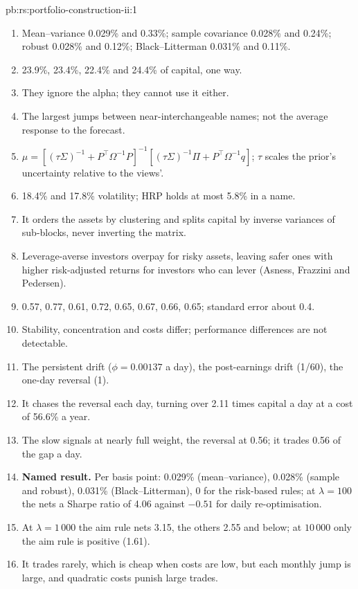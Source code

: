 \begin{solution}{pb:rs:portfolio-construction-ii:1}
\begin{enumerate}
\item Mean--variance 0.029\% and 0.33\%; sample covariance 0.028\% and 0.24\%; robust 0.028\% and 0.12\%; Black--Litterman 0.031\% and 0.11\%.
\item 23.9\%, 23.4\%, 22.4\% and 24.4\% of capital, one way.
\item They ignore the alpha; they cannot use it either.
\item The largest jumps between near-interchangeable names; not the average response to the forecast.
\item $\mu = [(\tau\Sigma)^{-1} + P^\top\Omega^{-1}P]^{-1}[(\tau\Sigma)^{-1}\Pi + P^\top\Omega^{-1}q]$; $\tau$ scales the prior's uncertainty relative to the views'.
\item 18.4\% and 17.8\% volatility; HRP holds at most 5.8\% in a name.
\item It orders the assets by clustering and splits capital by inverse variances of sub-blocks, never inverting the matrix.
\item Leverage-averse investors overpay for risky assets, leaving safer ones with higher risk-adjusted returns for investors who can lever (Asness, Frazzini and
Pedersen).
\item 0.57, 0.77, 0.61, 0.72, 0.65, 0.67, 0.66, 0.65; standard error about 0.4.
\item Stability, concentration and costs differ; performance differences are not detectable.
\item The persistent drift ($\phi = 0.00137$ a day), the post-earnings drift (1/60), the one-day reversal (1).
\item It chases the reversal each day, turning over 2.11 times capital a day at a cost of 56.6\% a year.
\item The slow signals at nearly full weight, the reversal at 0.56; it trades 0.56 of the gap a day.
\item \textbf{Named result.} Per basis point: 0.029\% (mean--variance), 0.028\% (sample and robust), 0.031\% (Black--Litterman), 0 for the risk-based rules; at
$\lambda = 100$ the  nets a Sharpe ratio of 4.06 against $-0.51$ for daily re-optimisation.
\item At $\lambda = 1\,000$ the aim rule nets 3.15, the others 2.55 and below; at $10\,000$ only the aim rule is positive (1.61).
\item It trades rarely, which is cheap when costs are low, but each monthly jump is large, and quadratic costs punish large trades.

\end{enumerate}
\end{solution}
